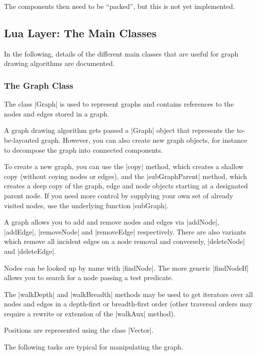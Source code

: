 The components then need to be ``packed'', but this is not yet
implemented.




\subsection{Lua Layer: The Main Classes}

In the following, details of the different main classes that are
useful for graph drawing algorithms are documented.


\subsubsection{The Graph Class}

The class |Graph| is used to represent graphs and contains
references to the nodes and edges stored in a graph.

A graph drawing algorithm gets passed a |Graph| object that represents
the to-be-layouted graph. However, you can also create new graph
objects, for instance to decompose the graph into connected
components. 

To create a new graph, you can use the |copy| method, which creates a 
shallow copy (without coying nodes or edges), and the
|subGraphParent| method, which creates a deep copy of the graph, edge
and node objects starting at a designated parent node. If you need
more control by supplying your own set of already visited nodes, use
the underlying function |subGraph|.

A graph allows you to add and remove nodes and edges via |addNode|,
|addEdge|, |removeNode| and |removeEdge| respectively.  There are also
variants which remove all incident edges on a node removal and
conversely, |deleteNode| and |deleteEdge|.

Nodes can be looked up by name with |findNode|. The more generic
|findNodeIf| allows you to search for a node passing a test
predicate. 

The |walkDepth| and |walkBreadth| methods may be used to get
iterators over all nodes and edges in a depth-first or breadth-first
order (other traversal orders may require a rewrite or extension of the
|walkAux| method).

Positions are represented using the class |Vector|.

The following tasks are typical for manipulating the graph.

